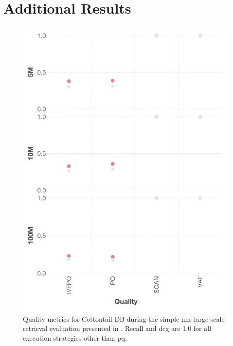 \section*{Additional Results}


\begin{figure}[p]
    \includegraphics[width=\linewidth]{figures/bignns-cottontail-NNS-quality}
    \caption{Quality metrics for Cottontail DB during the simple \acrshort{nns} large-scale retrieval evaluation presented in . Recall and \acrshort{dcg} are 1.0 for all execution strategies other than \acrshort{pq}.}
    \label{figure:appendix_bignns_cottontail_nns_quality}
\end{figure}

